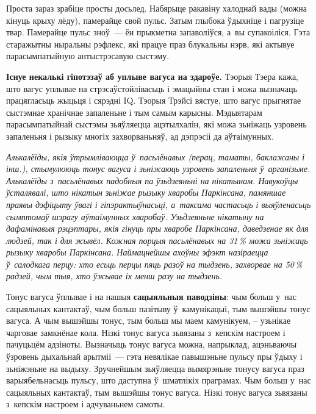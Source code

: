 Проста зараз зрабіце просты досьлед. Набярыце ракавіну халоднай вады (можна кінуць крыху лёду), памерайце свой пульс. Затым глыбока ўдыхніце і пагрузіце твар. Памерайце пульс зноў~--- ён прыкметна запаволіўся, а~вы супакоіліся. Гэта старажытны ныральны рэфлекс, які працуе праз блукальны нэрв, які актывуе парасымпатыйную антыстрэсавую сыстэму.

\textbf{Існуе некалькі гіпотэзаў аб уплыве вагуса на здароўе.} Тэорыя Тэера кажа, што вагус уплывае на стрэсаўстойлівасьць і эмацыйны стан і можа вызначаць працягласьць жыцьця і сярэдні IQ. Тэорыя Трэйсі вястуе, што вагус прыгнятае сыстэмнае хранічнае запаленьне і тым самым карысны. Мэдыятарам парасымпатыйнай сыстэмы зьяўляецца ацэтылхалін, які можа зьніжаць узровень запаленьня і рызыку многіх захворваньняў, ад дэпрэсіі да аўтаімунных.

\emph{Алькалёіды, якія ўтрымліваюцца ў~пасьлёнавых (перац, таматы, баклажаны і інш.), стымулююць тонус вагуса і зьніжаюць узровень запаленьня ў~арганізьме. Алькалёіды з~пасьлёнавых падобныя па ўзьдзеяньні на нікатынам. Навукоўцы ўсталявалі, што нікатын зьніжае рызыку хваробы Паркінсана, памяншае праявы дэфіцыту ўвагі і гіпэрактыўнасьці, а~таксама частасьць і выяўленасьць сымптомаў шэрагу аўтаімунных хваробаў. Узьдзеяньне нікатыну на дафамінавыя рэцэптары, якія гінуць пры хваробе Паркінсана, даведзенае як для людзей, так і для жывёл. Кожная порцыя пасьлёнавых на 31\,\% можа зьніжаць рызыку хваробы Паркінсана. Наймацнейшы ахоўны эфэкт назіраецца ў~салодкага перцу: хто есьць перцы пяць разоў на тыдзень, захворвае на 50\,\% радзей, чым тыя, хто ўжывае іх менш разу на тыдзень.}

Тонус вагуса ўплывае і на нашыя \textbf{сацыяльныя паводзіны}: чым больш у~нас сацыяльных кантактаў, чым больш пазітыву ў~камунікацыі, тым вышэйшы тонус вагуса. А чым вышэйшы тонус, тым больш мы маем камунікуем, -- узьнікае чарговае замкнёнае кола. Нізкі тонус вагуса зьвязаны з~кепскім настроем і пачуцьцём адзіноты. Вызначыць тонус вагуса можна, напрыклад, ацэньваючы ўзровень дыхальнай арытміі~--- гэта невялікае павышэньне пульсу пры ўдыху і зьніжэньне на выдыху. Зручнейшым зьяўляецца вымярэньне тонусу вагуса праз варыябельнасьць пульсу, што даступна ў~шматлікіх праграмах. Чым больш у~нас сацыяльных кантактаў, тым вышэйшы тонус вагуса. Нізкі тонус вагуса зьвязаны з~кепскім настроем і адчуваньнем самоты.

